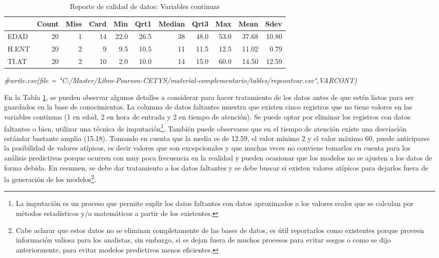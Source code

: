 \documentclass[]{book}
\newenvironment{Shaded}{\begin{snugshade}}{\end{snugshade}}
\newcommand{\CommentTok}[1]{\textcolor[rgb]{0.56,0.35,0.01}{\textit{{#1}}}}
\let\rmarkdownfootnote\footnote%
\def\footnote{\protect\rmarkdownfootnote}
\begin{document}
\begin{table}

\caption{\label{tab:reporte-de-calidad-varcont}Reporte de calidad de datos: Variables continuas}
\centering
\begin{tabular}[t]{l|r|r|r|r|r|r|r|r|r|r}
\hline
  & Count & Miss & Card & Min & Qrt1 & Median & Qrt3 & Max & Mean & Sdev\\
\hline
EDAD & 20 & 1 & 14 & 22.0 & 26.5 & 38 & 48.0 & 53.0 & 37.68 & 10.80\\
\hline
H.ENT & 20 & 2 & 9 & 9.5 & 10.5 & 11 & 11.5 & 12.5 & 11.02 & 0.79\\
\hline
TI.AT & 20 & 2 & 10 & 2.0 & 10.0 & 14 & 15.0 & 60.0 & 14.50 & 12.59\\
\hline
\end{tabular}
\end{table}

\begin{Shaded}
\begin{Highlighting}[]
\CommentTok{#write.csv(file = "C:/Master/Libro-Pearson-CETYS/material-complementario/tables/repcontvar.csv",VARCONT)}
\end{Highlighting}
\end{Shaded}

En la Tabla \ref{tab:reporte-de-calidad-varcont}, se pueden observar
algunos detalles a considerar para hacer tratamiento de los datos antes
de que estén listos para ser guardados en la base de conocimientos. La
columna de datos faltantes muestra que existen cinco registros que no
tiene valores en las variables continuas (1 en edad, 2 en hora de
entrada y 2 en tiempo de atención). Se puede optar por eliminar los
registros con datos faltantes o bien, utilizar una técnica de
imputación\footnote{La imputación es un proceso que permite suplir los
  datos faltantes con datos aproximados a los valores reales que se
  calculan por métodos estadísticos y/o matemáticos a partir de los
  existentes.}. También puede observarse que en el tiempo de atención
existe una desviación estándar bastante amplia (15.18). Tomando en
cuenta que la media es de 12.59, el valor mínimo 2 y el valor máximo 60,
puede anticiparse la posibilidad de valores atípicos, es decir valores
que son excepcionales y que muchas veces no conviene tomarlos en cuenta
para los análisis predictivos porque ocurren con muy poca frecuencia en
la realidad y pueden ocasionar que los modelos no se ajusten a los datos
de forma debida. En resumen, se debe dar tratamiento a los datos
faltantes y se debe buscar si existen valores atípicos para dejarlos
fuera de la generación de los modelos\footnote{Cabe aclarar que estos
  datos no se eliminan completamente de las bases de datos, es útil
  reportarlos como existentes porque proveen información valiosa para
  los analistas, sin embargo, si se dejan fuera de muchos procesos para
  evitar sesgos o como se dijo anteriormente, para evitar modelos
  predictivos menos eficientes.}.
\end{document}
